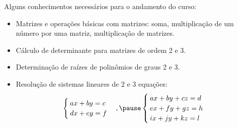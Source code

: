 \documentclass{beamer}
\begin{document}
\begin{frame}
    Alguns conhecimentos necessários para o andamento do curso:\pause
    \begin{itemize}
        \item[\color{blue}{$\bullet$}] Matrizes e operações básicas com matrizes: soma, multiplicação de um número por uma matriz, multiplicação de
              matrizes.\pause

        \item[\color{blue}{$\bullet$}] Cálculo de determinante para matrizes de ordem 2 e 3.\pause

        \item[\color{blue}{$\bullet$}] Determinação de raízes de polinômios de graus 2 e 3.\pause

        \item[\color{blue}{$\bullet$}] Resolução de sistemas lineares de 2 e 3 equações:\pause
              \[\begin{cases}
                      ax + by = c \\
                      dx + ey = f
                  \end{cases},\pause
                  \begin{cases}
                      ax + by + cz = d \\
                      ex + fy + gz = h \\
                      ix + jy + kz = l
                  \end{cases}
              \]
    \end{itemize}
\end{frame}
\end{document}
